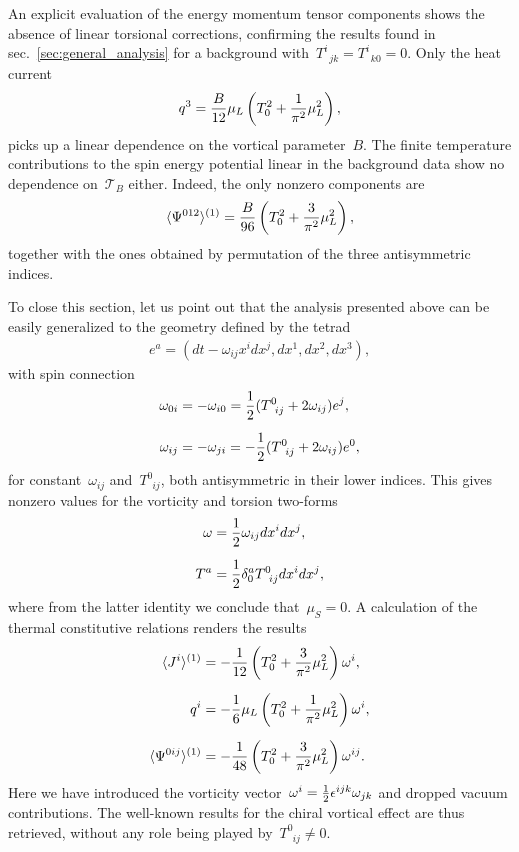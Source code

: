 \documentclass[11pt,a4paper]{article}
\begin{document}
An explicit evaluation of the energy momentum tensor components shows 
the absence of linear torsional corrections, confirming
the results found in sec.~\ref{sec:general_analysis} for a background 
with~$T^{i}_{\,\,\,jk}=T^{i}_{\,\,\,k0}=0$. Only the heat current 
\begin{align}
q^{3}={B\over 12}\mu_{L}
\left(T_{0}^{2}+{1\over \pi^{2}}\mu_{L}^{2}\right),
\end{align} 
picks up a linear dependence on the vortical parameter~$B$. 
The finite temperature contributions to the spin energy potential linear in the background data
show no dependence on~$\mathcal{T}_{B}$ either. Indeed, the only nonzero components 
are
\begin{align}
\langle\Psi^{012}\rangle^{(1)}={B\over 96}\left(T_{0}^{2}+{3\over \pi^{2}}\mu_{L}^{2}\right),
\end{align}
together with the ones obtained by permutation of the three antisymmetric indices.

To close this section, let us point out that the analysis  
presented above can be easily generalized to
the geometry defined by the tetrad
\begin{align}
e^{a}=\left(dt-\omega_{ij}x^{i}dx^{j},dx^{1},dx^{2},dx^{3}\right),
\end{align} 
with spin connection
\begin{align}
\omega_{0i}&=-\omega_{i0}={1\over 2}(T^{0}_{\,\,\,ij}+2\omega_{ij})e^{j}, 
\nonumber \\[0.2cm]
\omega_{ij}&=-\omega_{ji}=-{1\over 2}(T^{0}_{\,\,\,ij}+2\omega_{ij})e^{0},
\end{align}
for constant~$\omega_{ij}$ and~$T^{0}_{\,\,\,ij}$, both antisymmetric in their lower indices. 
This gives nonzero values for the vorticity and torsion two-forms
\begin{align}
\omega&={1\over 2}\omega_{ij}dx^{i}dx^{j}, \nonumber \\[0.2cm]
T^{a}&={1\over 2}\delta^{a}_{0}T^{0}_{\,\,\,ij}dx^{i}dx^{j},
\end{align} 
where from the latter identity we conclude that~$\mu_{S}=0$.
A calculation of the thermal constitutive relations renders the results
\begin{align}
\langle J^{i}\rangle^{(1)}&=-{1\over 12}
\left(T_{0}^{2}+{3\over \pi^{2}}\mu_{L}^{2}\right)\omega^{i}, \nonumber \\[0.2cm]
q^{i}&=-{1\over 6}\mu_{L}
\left(T_{0}^{2}+{1\over \pi^{2}}\mu_{L}^{2}\right)\omega^{i}, \\[0.2cm]
\langle \Psi^{0ij}\rangle^{(1)}&=-{1\over 48}
\left(T_{0}^{2}+{3\over \pi^{2}}\mu_{L}^{2}\right)\omega^{ij}.
\nonumber
\end{align}
Here we have introduced
the vorticity vector~$\omega^{i}={1\over 2}\epsilon^{ijk}\omega_{jk}$ and 
dropped vacuum contributions. The well-known results for the chiral vortical effect are thus retrieved, without any
role being played by~$T^{0}_{\,\,\,ij}\neq 0$.    
\end{document}
